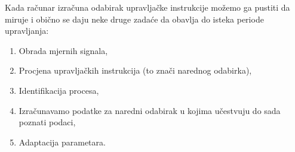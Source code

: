 \documentclass{article}
\newenvironment{defquote}
	{\begin{center}\begin{minipage}{0.9\linewidth}\begin{mdframed}[linewidth=1.2pt]}
		{\end{mdframed}\end{minipage}\end{center}}
\begin{document}
	\begin{defquote}
		Kada računar izračuna odabirak upravljačke instrukcije možemo ga pustiti da miruje i obično se daju neke druge zadaće da obavlja do isteka periode upravljanja:
		\begin{enumerate}
			\item Obrada mjernih signala,
			\item Procjena upravljačkih instrukcija (to znači narednog odabirka),
			\item Identifikacija procesa,
			\item Izračunavamo podatke za naredni odabirak u kojima učestvuju do sada poznati podaci,
			\item Adaptacija parametara.
		\end{enumerate}
	\end{defquote}
	
\end{document}
